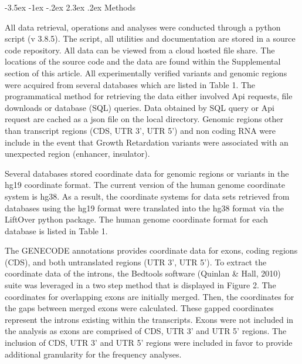 \documentclass[11pt]{article}
\makeatletter
\renewcommand\section{\@startsection {section}{1}{\z@}%
                                       {-3.5ex \@plus -1ex \@minus -.2ex}%
                                       {2.3ex \@plus.2ex}%
                                       {\normalfont\fontfamily{phv}\fontsize{16}{19}\bfseries}}
\makeatother
\begin{document}
\section{Methods} \label{s:methods}

 

All data retrieval, operations and analyses were conducted through a python script (v 3.8.5). The script, all utilities and documentation are stored in a source code repository. All data can be viewed from a cloud hosted file share. The locations of the source code and the data are found within the Supplemental section of this article. All experimentally verified variants and genomic regions were acquired from several databases which are listed in Table 1. The programmatical method for retrieving the data either involved Api requests, file downloads or database (SQL) queries. Data obtained by SQL query or Api request are cached as a json file on the local directory. Genomic regions other than transcript regions (CDS, UTR 3’, UTR 5’) and non coding RNA were include in the event that Growth Retardation variants were associated with an unexpected region (enhancer, insulator). 

Several databases stored coordinate data for genomic regions or variants in the hg19 coordinate format. The current version of the human genome coordinate system is hg38. As a result, the coordinate systems for data sets retrieved from databases using the hg19 format were translated into the hg38 format via the LiftOver python package. The human genome coordinate format for each database is listed in Table 1. 

The GENECODE annotations provides coordinate data for exons, coding regions (CDS), and both untranslated regions (UTR 3’, UTR 5’). To extract the coordinate data of the introns, the Bedtools software (Quinlan & Hall, 2010) suite was leveraged in a two step method that is displayed in Figure 2. The coordinates for overlapping exons are initially merged. Then, the coordinates for the gaps between merged exons were calculated. These gapped coordinates represent the introns existing within the transcripts. Exons were not included in the analysis as exons are comprised of CDS, UTR 3’ and UTR 5’ regions. The inclusion of CDS, UTR 3’ and UTR 5’ regions were included in favor to provide additional granularity for the frequency analyses. 
\end{document}
